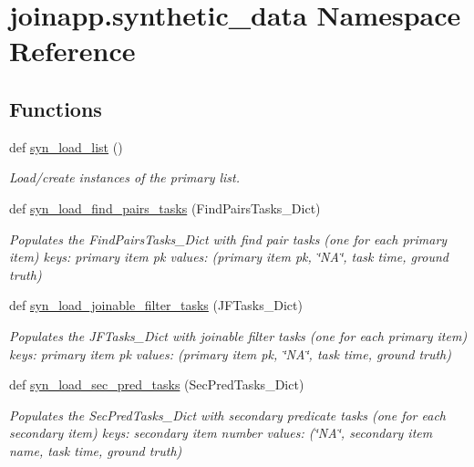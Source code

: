 \hypertarget{namespacejoinapp_1_1synthetic__data}{}\section{joinapp.\+synthetic\+\_\+data Namespace Reference}
\label{namespacejoinapp_1_1synthetic__data}
\subsection*{Functions}
\begin{DoxyCompactItemize}
\item 
def \mbox{\hyperlink{namespacejoinapp_1_1synthetic__data_a0d5f2eaec09d1edc8531ab9f8c85f7f0}{syn\+\_\+load\+\_\+list}} ()
\begin{DoxyCompactList}\small\item\em Load/create instances of the primary list. \end{DoxyCompactList}\item 
def \mbox{\hyperlink{namespacejoinapp_1_1synthetic__data_a14be15b18ecf80f61e02b26f86262041}{syn\+\_\+load\+\_\+find\+\_\+pairs\+\_\+tasks}} (Find\+Pairs\+Tasks\+\_\+\+Dict)
\begin{DoxyCompactList}\small\item\em Populates the Find\+Pairs\+Tasks\+\_\+\+Dict with find pair tasks (one for each primary item) keys\+: primary item pk values\+: (primary item pk, \char`\"{}\+N\+A\char`\"{}, task time, ground truth) \end{DoxyCompactList}\item 
def \mbox{\hyperlink{namespacejoinapp_1_1synthetic__data_abc7c245396b8cec18cd7217cfc3d9be7}{syn\+\_\+load\+\_\+joinable\+\_\+filter\+\_\+tasks}} (J\+F\+Tasks\+\_\+\+Dict)
\begin{DoxyCompactList}\small\item\em Populates the J\+F\+Tasks\+\_\+\+Dict with joinable filter tasks (one for each primary item) keys\+: primary item pk values\+: (primary item pk, \char`\"{}\+N\+A\char`\"{}, task time, ground truth) \end{DoxyCompactList}\item 
def \mbox{\hyperlink{namespacejoinapp_1_1synthetic__data_ad810e597b5840cec557a1878d90c6589}{syn\+\_\+load\+\_\+sec\+\_\+pred\+\_\+tasks}} (Sec\+Pred\+Tasks\+\_\+\+Dict)
\begin{DoxyCompactList}\small\item\em Populates the Sec\+Pred\+Tasks\+\_\+\+Dict with secondary predicate tasks (one for each secondary item) keys\+: secondary item number values\+: (\char`\"{}\+N\+A\char`\"{}, secondary item name, task time, ground truth) \end{DoxyCompactList}\item 

\end{DoxyCompactItemize}
